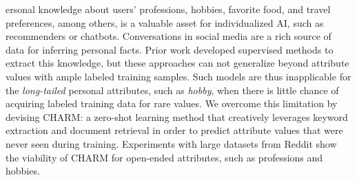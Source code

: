 ersonal knowledge about users' professions, hobbies, favorite food, and travel preferences, among others,
is a valuable asset for individualized AI, such as
recommenders or chatbots.
Conversations in social media are
a rich source of data for inferring 
personal facts.
Prior work developed supervised %
methods to extract this knowledge, 
but these approaches
can not generalize beyond 
attribute values 
with ample labeled training samples. 
Such models are thus inapplicable for the \textit{long-tailed} personal attributes, such as \textit{hobby}, when there is little chance of acquiring labeled training data for rare values.
We overcome
this limitation
by devising CHARM: a
zero-shot learning
method 
that creatively leverages keyword extraction and document retrieval
in order to
predict attribute values 
that were never seen during training.
Experiments with 
large datasets from Reddit
show the viability of CHARM
for open-ended attributes, such as professions
and hobbies.
